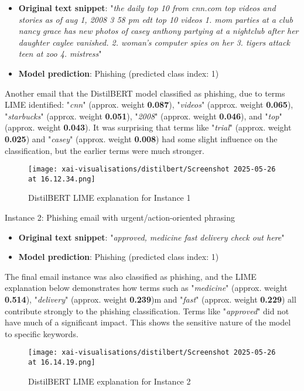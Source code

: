 \begin{itemize}
  \item \textbf{Original text snippet}: "\textit{the daily top 10 from cnn.com top videos and stories as of aug 1, 2008 3 58 pm edt top 10 videos 1. mom parties at a club nancy grace has new photos of casey anthony partying at a nightclub after her daughter caylee vanished. 2. woman's computer spies on her 3. tigers attack teen at zoo 4. mistress}"
  \item \textbf{Model prediction}: Phishing (predicted class index: 1)
\end{itemize}

\noindent Another email that the DistilBERT model classified as phishing, due to terms LIME identified: "\textit{cnn}" (approx. weight \textbf{0.087}), "\textit{videos}" (approx. weight \textbf{0.065}), "\textit{starbucks}" (approx. weight \textbf{0.051}), "\textit{2008}" (approx. weight \textbf{0.046}), and "\textit{top}" (approx. weight \textbf{0.043}). It was surprising that terms like "\textit{trial}" (approx. weight \textbf{0.025}) and "\textit{casey}" (approx. weight \textbf{0.008}) had some slight influence on the classification, but the earlier terms were much stronger.

\newpage

\vspace{0.5cm}
\begin{figure}[H]
  \begin{center}
    \texttt{[image: xai-visualisations/distilbert/Screenshot 2025-05-26 at 16.12.34.png]}
    \caption{DistilBERT LIME explanation for Instance 1}
  \end{center}
\end{figure}

\newpage

\noindent Instance 2: Phishing email with urgent/action-oriented phrasing

\begin{itemize}
  \item \textbf{Original text snippet}: "\textit{approved, medicine fast delivery check out here}"
  \item \textbf{Model prediction}: Phishing (predicted class index: 1)
\end{itemize}

\noindent The final email instance was also classified as phishing, and the LIME explanation below demonstrates how terms such as "\textit{medicine}" (approx. weight \textbf{0.514}), "\textit{delivery}" (approx. weight \textbf{0.239})m and "\textit{fast}" (approx. weight \textbf{0.229}) all contribute strongly to the phishing classification. Terms like "\textit{approved}" did not have much of a significant impact. This shows the sensitive nature of the model to specific keywords.

\newpage

\vspace{0.5cm}
\begin{figure}[H]
  \begin{center}
    \texttt{[image: xai-visualisations/distilbert/Screenshot 2025-05-26 at 16.14.19.png]}
    \caption{DistilBERT LIME explanation for Instance 2}
  \end{center}
\end{figure}
